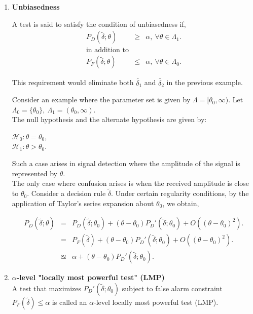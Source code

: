\documentclass[a4paper,english,12pt]{article}
\begin{document}
\begin{enumerate}
\item \textbf{Unbiasedness}
\begin{defn}{A test is said to satisfy the condition of unbiasedness if,
\begin{eqnarray*} 
P_D(\tilde{ \delta};\theta)&\geq&\alpha,  ~ \forall  \theta \in  \Lambda_1. \\
\mbox{in addition to}\\
P_F(\tilde{\delta};\theta) &\leq& \alpha,  ~ \forall  \theta \in  \Lambda_0.
\end{eqnarray*}
}
\end{defn}	
This requirement would eliminate both $\tilde{\delta_1}$ and $\tilde{\delta_2}$ in the previous example.  

\begin{exmp} Consider an example where the parameter set is given by $\Lambda = [\theta_0,\infty).$ Let $\Lambda_0 = \{\theta_0\}, ~ \Lambda_1 = (\theta_0, \infty)$.\\
The null hypothesis and the alternate hypothesis are given by:
\begin{center}
$\mathcal{H}_0 : \theta = \theta_0$, \\ $\mathcal{H}_1 : \theta > \theta_0.$
\end{center}
Such a case arises in signal detection where the amplitude of the signal is represented by $\theta$.\\
The only case where confusion arises is when the received amplitude is close to $\theta_0$. Consider a decision rule $\tilde{\delta}$. Under certain regularity conditions, by the application of Taylor's series expansion about $\theta_0$, we obtain,

\begin{eqnarray}
P_D(\tilde{ \delta};\theta) &=& P_D(\tilde{ \delta};\theta_0) + (\theta - \theta_0) P_{D}'(\tilde{ \delta};\theta_0) + O((\theta - \theta_0)^2). \nonumber \\
&=&P_F(\tilde{ \delta}) + (\theta - \theta_0) P_{D}'(\tilde{ \delta};\theta_0) + O((\theta - \theta_0)^2). \nonumber \\
&\approxeq& \alpha + (\theta - \theta_0) P_{D}'(\tilde{ \delta};\theta_0).
\end{eqnarray} 
\end{exmp}

\item \textbf{$\alpha$-level "locally most powerful test" (LMP)}
\\A test that maximizes $P_{D}'(\tilde{\delta};\theta_0)$ subject to false alarm constraint $P_F(\tilde{\delta}) \leq \alpha$ is called an $\alpha$-level locally most powerful test (LMP).


\end{enumerate}
\end{document}
